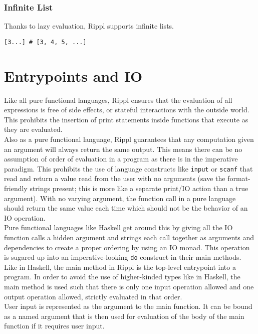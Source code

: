 \documentclass[5pt]{article}
\begin{document}
\subsubsection{Infinite List}
Thanks to lazy evaluation, Rippl supports infinite lists. 

\begin{lstlisting}[language=rippl]
[3...] # [3, 4, 5, ...] 
\end{lstlisting}
\section{Entrypoints and IO}
Like all pure functional languages, Rippl ensures that the evaluation of all expressions is free of side effects, or stateful interactions with the outside world. This prohibits the insertion of print statements inside functions that execute as they are evaluated. \\

\noindent Also as a pure functional language, Rippl guarantees that any computation given an argument will always return the same output. This means there can be no assumption of order of evaluation in a program as there is in the imperative paradigm. This prohibits the use of language constructs like \texttt{input} or \texttt{scanf} that read and return a value read from the user with no arguments (save the format-friendly strings present; this is more like a separate print/IO action than a true argument). With no varying argument, the function call in a pure language should return the same value each time which should not be the behavior of an IO operation. \\

\noindent Pure functional languages like Haskell get around this by giving all the IO function calls a hidden argument and strings each call together as arguments and dependencies to create a proper ordering by using an IO monad. This operation is sugared up into an imperative-looking \texttt{do} construct in their main methods. \\

\noindent Like in Haskell, the main method in Rippl is the top-level entrypoint into a program. In order to avoid the use of higher-kinded types like in Haskell, the main method is used such that there is only one input operation allowed and one output operation allowed, strictly evaluated in that order.  \\

User input is represented as the argument to the main function. It can be bound as a named argument that is then used for evaluation of the body of the main function if it requires user input. \\
\end{document}
